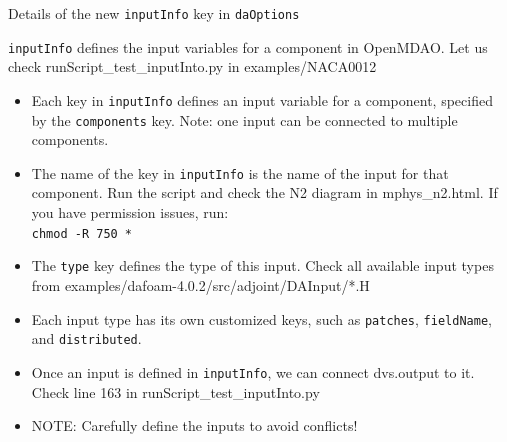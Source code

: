 \documentclass{bredelebeamer}
\begin{document}
\begin{frame}{Details of the new \texttt{inputInfo} key in \texttt{daOptions}}

  \texttt{inputInfo} defines the input variables for a component in OpenMDAO. Let us check runScript\_test\_inputInto.py in examples/NACA0012
  
  \begin{itemize}
  
    \item Each key in \texttt{inputInfo} defines an input variable for a component, specified by the \texttt{components} key. Note: one input can be connected to multiple components.
    \item The name of the key in \texttt{inputInfo} is the name of the input for that component. Run the script and check the N2 diagram in mphys\_n2.html. If you have permission issues, run: \\ \texttt{chmod -R 750 *}
    \item The \texttt{type} key defines the type of this input. Check all available input types from examples/dafoam-4.0.2/src/adjoint/DAInput/*.H
    \item Each input type has its own customized keys, such as \texttt{patches}, \texttt{fieldName}, and \texttt{distributed}.
    \item Once an input is defined in \texttt{inputInfo}, we can connect dvs.output to it. Check line 163 in runScript\_test\_inputInto.py
    \item NOTE: Carefully define the inputs to avoid conflicts!
  \end{itemize}
  
  \end{frame}
\end{document}
